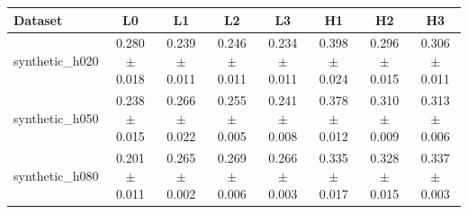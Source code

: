\begin{tabular}{lccccccc}
\toprule
Dataset & L0 & L1 & L2 & L3 & H1 & H2 & H3 \\
\midrule
synthetic_h020 & 0.280 $\pm$ 0.018 & 0.239 $\pm$ 0.011 & 0.246 $\pm$ 0.011 & 0.234 $\pm$ 0.011 & 0.398 $\pm$ 0.024 & 0.296 $\pm$ 0.015 & 0.306 $\pm$ 0.011 \\
synthetic_h050 & 0.238 $\pm$ 0.015 & 0.266 $\pm$ 0.022 & 0.255 $\pm$ 0.005 & 0.241 $\pm$ 0.008 & 0.378 $\pm$ 0.012 & 0.310 $\pm$ 0.009 & 0.313 $\pm$ 0.006 \\
synthetic_h080 & 0.201 $\pm$ 0.011 & 0.265 $\pm$ 0.002 & 0.269 $\pm$ 0.006 & 0.266 $\pm$ 0.003 & 0.335 $\pm$ 0.017 & 0.328 $\pm$ 0.015 & 0.337 $\pm$ 0.003 \\
\bottomrule
\end{tabular}
